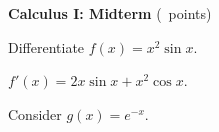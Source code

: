 \documentclass[addpoints,answers]{exam}
\begin{document}
\begin{center}\textbf{Calculus I: Midterm} \quad (\numpoints\ points)\end{center}
\begin{questions}
\question[4] Differentiate $f(x) = x^2 \sin x$.
\begin{solution} $f'(x) = 2x\sin x + x^2\cos x$. \end{solution}
\question Consider $g(x) = e^{-x}$.
\end{questions}
\gradetable[h][questions]
\end{document}

